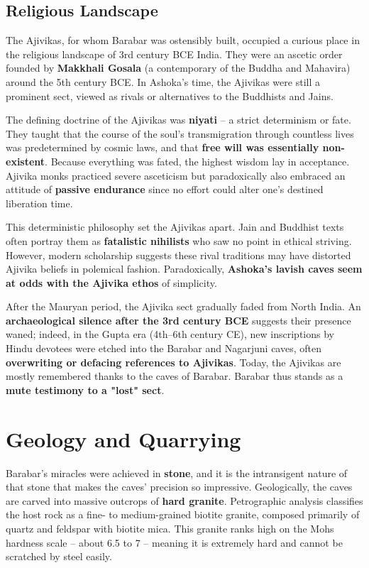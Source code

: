 \documentclass[11pt]{article}
\begin{document}
\subsection{Religious Landscape}

The Ajivikas, for whom Barabar was ostensibly built, occupied a curious place in the religious landscape of 3rd century BCE India. They were an ascetic order founded by \textbf{Makkhali Gosala} (a contemporary of the Buddha and Mahavira) around the 5th century BCE. In Ashoka's time, the Ajivikas were still a prominent sect, viewed as rivals or alternatives to the Buddhists and Jains.

The defining doctrine of the Ajivikas was \textbf{niyati} -- a strict determinism or fate. They taught that the course of the soul's transmigration through countless lives was predetermined by cosmic laws, and that \textbf{free will was essentially non-existent}. Because everything was fated, the highest wisdom lay in acceptance. Ajivika monks practiced severe asceticism but paradoxically also embraced an attitude of \textbf{passive endurance} since no effort could alter one's destined liberation time.

This deterministic philosophy set the Ajivikas apart. Jain and Buddhist texts often portray them as \textbf{fatalistic nihilists} who saw no point in ethical striving. However, modern scholarship suggests these rival traditions may have distorted Ajivika beliefs in polemical fashion. Paradoxically, \textbf{Ashoka's lavish caves seem at odds with the Ajivika ethos} of simplicity.

After the Mauryan period, the Ajivika sect gradually faded from North India. An \textbf{archaeological silence after the 3rd century BCE} suggests their presence waned; indeed, in the Gupta era (4th--6th century CE), new inscriptions by Hindu devotees were etched into the Barabar and Nagarjuni caves, often \textbf{overwriting or defacing references to Ajivikas}. Today, the Ajivikas are mostly remembered thanks to the caves of Barabar. Barabar thus stands as a \textbf{mute testimony to a "lost" sect}.

\section{Geology and Quarrying}

Barabar's miracles were achieved in \textbf{stone}, and it is the intransigent nature of that stone that makes the caves' precision so impressive. Geologically, the caves are carved into massive outcrops of \textbf{hard granite}. Petrographic analysis classifies the host rock as a fine- to medium-grained biotite granite, composed primarily of quartz and feldspar with biotite mica. This granite ranks high on the Mohs hardness scale -- about 6.5 to 7 -- meaning it is extremely hard and cannot be scratched by steel easily.
\end{document}
